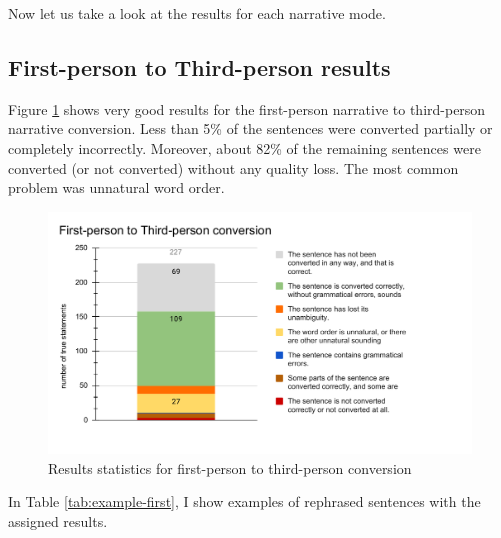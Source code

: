 Now let us take a look at the results for each narrative mode.

\subsection{First-person to Third-person results}

Figure \ref{fig:eval-first-to-third} shows very good results for the first-person narrative to third-person narrative conversion. Less than 5\% of the sentences were converted partially or completely incorrectly. Moreover, about 82\% of the remaining sentences were converted (or not converted) without any quality loss. The most common problem was unnatural word order.

\begin{figure}[!ht]
\includegraphics[width=\textwidth]{data/Eval-First-To-Third.pdf}
\caption{Results statistics for first-person to third-person conversion}
\label{fig:eval-first-to-third}
\end{figure}

In Table \ref{tab:example-first}, I show examples of rephrased sentences with the assigned results.

